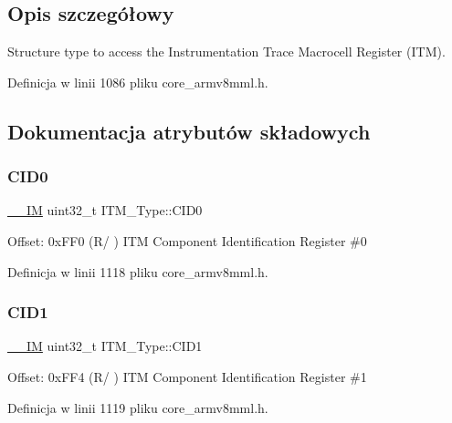 \subsection{Opis szczegółowy}
Structure type to access the Instrumentation Trace Macrocell Register (I\+TM). 

Definicja w linii 1086 pliku core\+\_\+armv8mml.\+h.



\subsection{Dokumentacja atrybutów składowych}
\mbox{\label{struct_i_t_m___type_a30bb2b166b1723867da4a708935677ba}} 
\subsubsection{\texorpdfstring{C\+I\+D0}{CID0}}
{\footnotesize\ttfamily \hyperlink{core__sc300_8h_a4cc1649793116d7c2d8afce7a4ffce43}{\+\_\+\+\_\+\+IM} uint32\+\_\+t I\+T\+M\+\_\+\+Type\+::\+C\+I\+D0}

Offset\+: 0x\+F\+F0 (R/ ) I\+TM Component Identification Register \#0 

Definicja w linii 1118 pliku core\+\_\+armv8mml.\+h.

\mbox{\label{struct_i_t_m___type_ac40df2c3a6cef02f90b4e82c8204756f}} 
\subsubsection{\texorpdfstring{C\+I\+D1}{CID1}}
{\footnotesize\ttfamily \hyperlink{core__sc300_8h_a4cc1649793116d7c2d8afce7a4ffce43}{\+\_\+\+\_\+\+IM} uint32\+\_\+t I\+T\+M\+\_\+\+Type\+::\+C\+I\+D1}

Offset\+: 0x\+F\+F4 (R/ ) I\+TM Component Identification Register \#1 

Definicja w linii 1119 pliku core\+\_\+armv8mml.\+h.

\mbox{\label{struct_i_t_m___type_a8000b92e4e528ae7ac4cb8b8d9f6757d}} 
